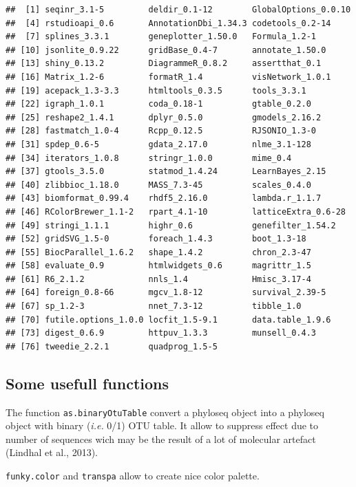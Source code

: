 \documentclass[12pt]{article}\usepackage[]{graphicx}\usepackage[]{color}
\makeatletter
\newenvironment{kframe}{%
 \def\at@end@of@kframe{}%
 \ifinner\ifhmode%
  \def\at@end@of@kframe{\end{minipage}}%
  \begin{minipage}{\columnwidth}%
 \fi\fi%
 \def\FrameCommand##1{\hskip\@totalleftmargin \hskip-\fboxsep
 \colorbox{shadecolor}{##1}\hskip-\fboxsep
     \hskip-\linewidth \hskip-\@totalleftmargin \hskip\columnwidth}%
 \MakeFramed {\advance\hsize-\width
   \@totalleftmargin\z@ \linewidth\hsize
   \@setminipage}}%
 {\par\unskip\endMakeFramed%
 \at@end@of@kframe}
\newenvironment{knitrout}{}{} %
\numberwithin{figure}{section}
\makeatother
\begin{document}
\begin{knitrout}
\begin{kframe}
\begin{verbatim}
##  [1] seqinr_3.1-5         deldir_0.1-12        GlobalOptions_0.0.10
##  [4] rstudioapi_0.6       AnnotationDbi_1.34.3 codetools_0.2-14    
##  [7] splines_3.3.1        geneplotter_1.50.0   Formula_1.2-1       
## [10] jsonlite_0.9.22      gridBase_0.4-7       annotate_1.50.0     
## [13] shiny_0.13.2         DiagrammeR_0.8.2     assertthat_0.1      
## [16] Matrix_1.2-6         formatR_1.4          visNetwork_1.0.1    
## [19] acepack_1.3-3.3      htmltools_0.3.5      tools_3.3.1         
## [22] igraph_1.0.1         coda_0.18-1          gtable_0.2.0        
## [25] reshape2_1.4.1       dplyr_0.5.0          gmodels_2.16.2      
## [28] fastmatch_1.0-4      Rcpp_0.12.5          RJSONIO_1.3-0       
## [31] spdep_0.6-5          gdata_2.17.0         nlme_3.1-128        
## [34] iterators_1.0.8      stringr_1.0.0        mime_0.4            
## [37] gtools_3.5.0         statmod_1.4.24       LearnBayes_2.15     
## [40] zlibbioc_1.18.0      MASS_7.3-45          scales_0.4.0        
## [43] biomformat_0.99.4    rhdf5_2.16.0         lambda.r_1.1.7      
## [46] RColorBrewer_1.1-2   rpart_4.1-10         latticeExtra_0.6-28 
## [49] stringi_1.1.1        highr_0.6            genefilter_1.54.2   
## [52] gridSVG_1.5-0        foreach_1.4.3        boot_1.3-18         
## [55] BiocParallel_1.6.2   shape_1.4.2          chron_2.3-47        
## [58] evaluate_0.9         htmlwidgets_0.6      magrittr_1.5        
## [61] R6_2.1.2             nnls_1.4             Hmisc_3.17-4        
## [64] foreign_0.8-66       mgcv_1.8-12          survival_2.39-5     
## [67] sp_1.2-3             nnet_7.3-12          tibble_1.0          
## [70] futile.options_1.0.0 locfit_1.5-9.1       data.table_1.9.6    
## [73] digest_0.6.9         httpuv_1.3.3         munsell_0.4.3       
## [76] tweedie_2.2.1        quadprog_1.5-5
\end{verbatim}
\end{kframe}
\end{knitrout}

  \subsection{Some usefull functions}
 
The function \texttt{as.binaryOtuTable} convert a phyloseq object into a phyloseq object with binary (\textit{i.e.} 0/1) OTU table. It allow to suppress effect due to number of sequences wich may be the result of a lot of molecular artefact (Lindhal et al., 2013).

\texttt{funky.color} and \texttt{transpa} allow to create nice color palette. 
\end{document}
